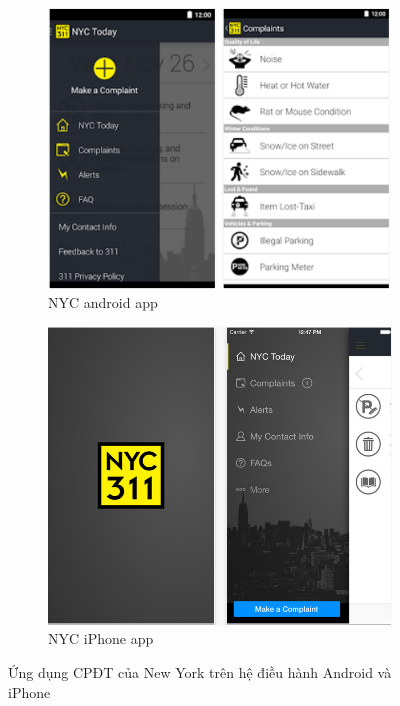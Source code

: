 \documentclass[a4paper]{article}
\begin{document}
\begin{figure}[h]
\centering
\begin{subfigure}{.5\textwidth}
  \centering
  \includegraphics[width=0.9\linewidth]{newyork_android.PNG}
  \caption{NYC android app}
\end{subfigure}%
\begin{subfigure}{.47\textwidth}
  \centering
  \includegraphics[width=0.9\linewidth]{newyork_iphones.PNG}
  \caption{NYC iPhone app}
  \label{fig:sub2}
\end{subfigure}
\caption{Ứng dụng CPĐT của New York trên hệ điều hành Android và iPhone}
\end{figure}
\end{document}
